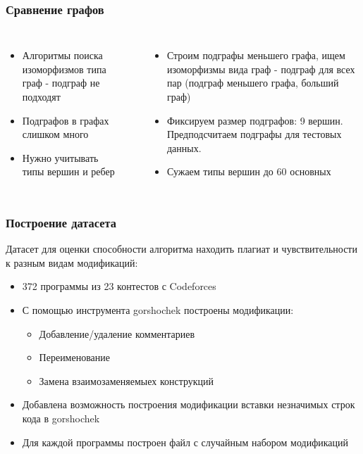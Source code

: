 \documentclass[10pt]{beamer}
\begin{document}
\begin{frame}\frametitle{Сравнение графов}
	\begin{columns}[T]
		\begin{itemize}
		\item Алгоритмы поиска изоморфизмов типа граф - подграф не подходят
		\item Подграфов в графах слишком много
		\item Нужно учитывать типы вершин и ребер
		\end{itemize}
	
	\rule{.1mm}{0.7\textheight}
	
	\begin{itemize}
	\item Строим подграфы меньшего графа, ищем изоморфизмы вида граф - подграф для всех пар (подграф меньшего графа, больший граф)
	\item Фиксируем размер подграфов: 9 вершин. Предподсчитаем подграфы для тестовых данных.
	\item Сужаем типы вершин до 60 основных
	\end{itemize}
	\end{columns}
 
\end{frame}

\begin{frame}\frametitle{Построение датасета}
	Датасет для оценки способности алгоритма находить плагиат и чувствительности к разным видам модификаций:
	\begin{itemize}
		\item 372 программы из 23 контестов с Codeforces
		\item С помощью инструмента gorshochek построены модификации:
		\begin{itemize} 
			\item Добавление/удаление комментариев
			\item Переименование
			\item Замена взаимозаменяемыех конструкций
		\end{itemize}
		\item Добавлена возможность построения модификации вставки незначимых строк кода в gorshochek
		\item Для каждой программы построен файл с случайным набором модификаций
	\end{itemize}
	
\end{frame}
\end{document}
